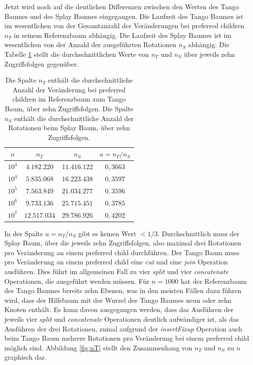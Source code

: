 \documentclass[a4paper,12pt]{article}
\begin{document}
Jetzt wird noch auf die deutlichen Differenzen zwischen den Werten des Tango Baumes und des Splay Baumes eingegangen. Die Laufzeit des Tango Baumes ist im wesentlichen von der Gesamtanzahl der Veränderungen  bei preferred children $n_T$ in seinem Referenzbaum  abhängig. Die Laufzeit des Splay Baumes ist im wesentlichen von der Anzahl der ausgeführten Rotationen $n_S$ abhängig. Die Tabelle \ref{tab:Ran} stellt die durchschnittlichen Werte von $n_T$ und $n_S$ über jeweils zehn Zugriffsfolgen gegenüber.    
\begin{table}[H] 
	\begin{center}
		\begin{tabular}	[c]{|c|c|c|c|}  
			\hline
			$n$ & $n_T$ & $n_S$ & $a = n_T / n_S$\\
			\hline
			$10^3$ & $4.182.220$ &$11.416.122$ &$0,3663$\\
			\hline
			$10^4$  & $5.835.068$ &$16.223.438$&$0,3597$  \\
			\hline
			$10^5$  & $7.563.849$ &$21.034.277$ & $0,3596$\\
			\hline
			$10^6$  & $9.733.136$ &$25.715.451$ & $0,3785$\\
			\hline
			$10^7$  & $12.517.034$ &$29.786.926$ & $0,4202$\\
			\hline
		\end{tabular}
		\caption{Die Spalte $n_T$ enthält die durchschnittliche Anzahl der Veränderung bei preferred children im Referenzbaum zum Tango Baum, über zehn Zugriffsfolgen. Die Spalte $n_S$ enthält die durchschnittliche Anzahl der Rotationen beim Splay Baum, über zehn Zugriffsfolgen.   }  
		\label{tab:Ran}
	\end{center}
\end{table}
\noindent In der Spalte $a = n_T / n_S$ gibt es  keinen Wert $< 1/3$. Durchschnittlich muss der Splay Baum, über die jeweils zehn Zugriffsfolgen, also maximal drei Rotationen pro Veränderung an einem preferred child durchführen. Der Tango Baum muss pro Veränderung an einem preferred child eine \textit{cut} und eine \textit{join} Operation ausführen. Dies führt im allgemeinen Fall zu vier \textit{split} und vier \textit{concatenate} Operationen,  die ausgeführt werden müssen. Für $n = 1000$ hat der Referenzbaum des Tango Baumes bereits zehn Ebenen, was in den meisten Fällen dazu führen wird, dass der Hilfsbaum mit der Wurzel des Tango Baumes neun oder zehn Knoten enthält. Es kann davon ausgegangen werden, dass das Ausführen der jeweils vier  \textit{split} und \textit{concatenate} Operationen deutlich aufwändiger ist, als das Ausführen der drei Rotationen, zumal aufgrund der \textit{insertFixup} Operation auch beim Tango Baum mehrere Rotationen pro Veränderung bei einem preferred child möglich sind. Abbildung \ref{fig:nT} stellt den Zusammenhang von $n_T$ und $n_S$ zu $n$ graphisch dar. 
\end{document}
